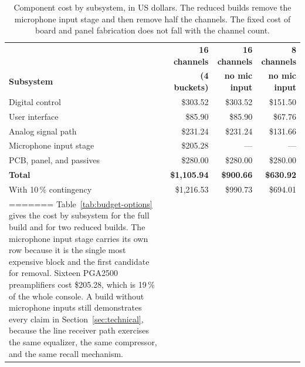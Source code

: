\documentclass[11pt, letterpaper,titlepage]{article}
\begin{document}


\begin{table}[H]
\centering
\caption{Hardware cost by subsystem for three build configurations. The
microphone input column removes the PGA2500 preamplifier stage only; balanced
line input and output remain in every configuration. Figures exclude shipping,
tariff, and tax.}
\label{tab:budget-summary}
\begin{tabular}{l r r r}
\toprule
 & \textbf{16 channels} & \textbf{16 channels} & \textbf{8 channels} \\
\textbf{Subsystem} & \textbf{(4 buckets)} & \textbf{no mic input} & \textbf{no mic input} \\
\midrule
Digital control            & \$303.52 & \$303.52 & \$151.50 \\
User interface             & \$85.90  & \$85.90  & \$67.76 \\
Analog signal path         & \$231.24 & \$231.24 & \$131.66 \\
Microphone input stage     & \$205.28 & ---      & --- \\
PCB, panel, and passives   & \$280.00 & \$280.00 & \$280.00 \\
\midrule
\textbf{Total}             & \textbf{\$1{,}105.94} & \textbf{\$900.66} & \textbf{\$630.92} \\
With 10\,\% contingency    & \$1{,}216.53 & \$990.73 & \$694.01 \\
=======
Table~\ref{tab:budget-options} gives the cost by subsystem for the full build
and for two reduced builds. The microphone input stage carries its own row
because it is the single most expensive block and the first candidate for
removal. Sixteen PGA2500 preamplifiers cost \$205.28, which is 19\,\% of the
whole console. A build without microphone inputs still demonstrates every claim
in Section~\ref{sec:technical}, because the line receiver path exercises the same equalizer, the
same compressor, and the same recall mechanism.

\begin{table}[h]
\centering
\caption{Component cost by subsystem, in US dollars. The reduced builds remove
the microphone input stage and then remove half the channels. The fixed cost of
board and panel fabrication does not fall with the channel count.}


\end{table}
\end{tabular}
\end{table}
\end{document}
